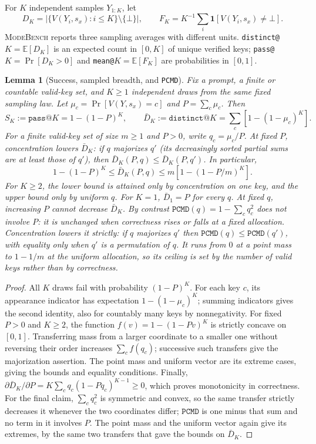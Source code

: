 \documentclass{article}
\newcommand{\1}{\mathbf 1}
\newcommand{\E}{\mathbb E}
\newcommand{\mb}{\textsc{ModeBench}}
\newcommand{\pmd}{\texttt{PCMD}}
\newtheorem{lemma}{Lemma}[section]
\theoremstyle{remark}
\theoremstyle{definition}
\theoremstyle{plain}
\begin{document}
For $K$ independent samples $Y_{1:K}$, let
\[
  D_K=\bigl|\{V(Y_i,s_x):i\le K\}\setminus\{\bot\}\bigr|,
  \qquad
  F_K=K^{-1}\sum_i \1[V(Y_i,s_x)\neq\bot].
\]
\mb{} reports three sampling averages with different units. \texttt{distinct@}$K
=\E[D_K]$ is an expected count in $[0,K]$ of unique verified keys;
\texttt{pass@}$K=\Pr[D_K>0]$ and \texttt{mean@}$K=\E[F_K]$ are probabilities
in $[0,1]$.

\begin{lemma}[Success, sampled breadth, and \pmd{}]
\label{lem:success-breadth}
Fix a prompt, a finite or countable valid-key set, and $K\ge1$ independent
draws from the same fixed sampling law. Let
$\mu_c=\Pr[V(Y,s_x)=c]$ and $P=\sum_c\mu_c$. Then
\begin{equation}
 S_K:=\texttt{pass@}K=1-(1-P)^K,\qquad
 \bar D_K:=\texttt{distinct@}K=\sum_c[1-(1-\mu_c)^K].
 \label{eq:success-breadth-identities}
\end{equation}
For a finite valid-key set of size $m\ge1$ and $P>0$, write $q_c=\mu_c/P$.
At fixed $P$, concentration lowers $\bar D_K$: if $q$ majorizes $q'$
(its decreasingly sorted partial sums are at least those of $q'$), then
$\bar D_K(P,q)\le\bar D_K(P,q')$. In particular,
\begin{equation}
 1-(1-P)^K\le\bar D_K(P,q)\le m[1-(1-P/m)^K].
 \label{eq:fixed-success-breadth-bounds}
\end{equation}
For $K\ge2$, the lower bound is attained only by concentration on one key,
and the upper bound only by uniform $q$. For $K=1$, $\bar D_1=P$ for every $q$.
At fixed $q$, increasing $P$ cannot decrease $\bar D_K$.
By contrast $\pmd(q)=1-\sum_c q_c^2$ does not involve $P$: it is unchanged when
correctness rises or falls at a fixed allocation. Concentration lowers it
strictly: if $q$ majorizes $q'$ then $\pmd(q)\le\pmd(q')$, with equality only
when $q'$ is a permutation of $q$. It runs from $0$ at a point mass to
$1-1/m$ at the uniform allocation, so its ceiling is set by the number of
valid keys rather than by correctness.
\end{lemma}
\begin{proof}
All $K$ draws fail with probability $(1-P)^K$. For each key $c$, its
appearance indicator has expectation $1-(1-\mu_c)^K$; summing indicators
gives the second identity, also for countably many keys by nonnegativity.
For fixed $P>0$ and $K\ge2$, the function
$f(v)=1-(1-Pv)^K$ is strictly concave on $[0,1]$.
Transferring mass from a larger coordinate to a smaller one without reversing
their order increases $\sum_c f(q_c)$; successive such transfers give the
majorization assertion. The point mass and uniform vector are its extreme
cases, giving the bounds and equality conditions. Finally,
$\partial\bar D_K/\partial P=K\sum_c q_c(1-Pq_c)^{K-1}\ge0$,
which proves monotonicity in correctness.
For the final claim, $\sum_c q_c^2$ is symmetric and convex, so the
same transfer strictly decreases it whenever the two coordinates differ;
$\pmd$ is one minus that sum and no term in it involves $P$. The point mass and
the uniform vector again give its extremes, by the same two transfers that gave
the bounds on $\bar D_K$.
\end{proof}
\end{document}
